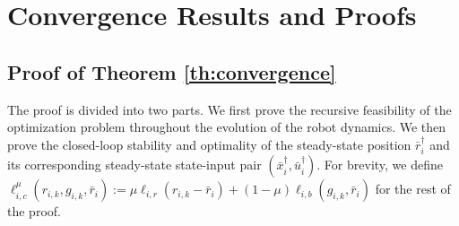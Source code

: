 \appendices
\section{Convergence Results and Proofs}
\label{app:convergence}
\subsection{Proof of Theorem \ref{th:convergence}}
The proof is divided into two parts. We first prove the recursive feasibility of the optimization problem throughout the evolution of the robot dynamics. We then prove the closed-loop stability and optimality of the steady-state position $\bar{r}_i^\dagger$ and its corresponding steady-state state-input pair $(\bar{x}_i^\dagger, \bar{u}_i^\dagger)$. For brevity, we define $\ell_{i,c}^\mu(r_{i,k},g_{i,k},\bar{r}_i) := \mu \ell_{i,r}(r_{i,k} - \bar{r}_i) + (1-\mu)\ell_{i,b}(g_{i,k}, \bar{r}_i)$ for the rest of the proof.

